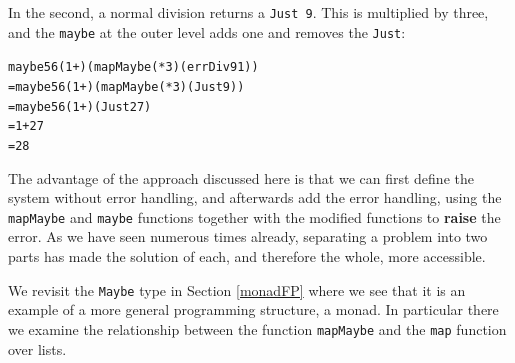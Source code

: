 In the second, a normal division returns a \texttt{Just 9}. This is multiplied by
three, and the \texttt{maybe} at the outer level adds one and removes the 
\texttt{Just}:
\begin{alltt}
maybe 56 (1+) (mapMaybe (*3) (errDiv 9 1))  
= maybe 56 (1+) (mapMaybe (*3) (Just 9)) 
= maybe 56 (1+) (Just 27)
= 1 + 27 
= 28
\end{alltt}
The advantage of the approach discussed here is that we can first define the
system without error handling, and afterwards add the error handling, using
the \texttt{mapMaybe} and \texttt{maybe} functions together with the modified functions
to \textbf{raise} the error. As we have seen numerous times already, separating
a problem into two parts has made the solution of each, and therefore the
whole, more accessible.

We revisit the \texttt{Maybe} type in Section \ref{monadFP} where we see that 
it is
an example of a more general programming structure, a monad. In
particular there we examine the relationship between the function
\texttt{mapMaybe} and the \texttt{map} function over lists.

